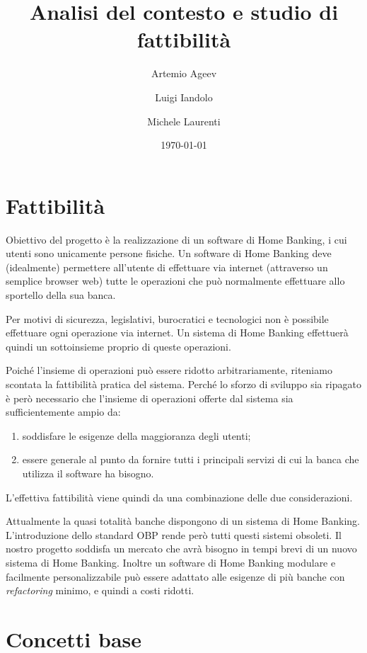 \documentclass[]{softeng}
\title{Analisi del contesto e studio di fattibilit\`a}
\author{Artemio Ageev \and Luigi Iandolo \and Michele Laurenti}
\date{\today}
\begin{document}
\maketitle


\section{Fattibilit\`a}

Obiettivo del progetto \`e la realizzazione di un software di Home Banking, i cui utenti sono unicamente persone fisiche.
Un software di Home Banking deve (idealmente) permettere all'utente di effettuare via internet (attraverso un semplice browser web) tutte le operazioni che pu\`o normalmente effettuare allo sportello della sua banca.

Per motivi di sicurezza, legislativi, burocratici e tecnologici non \`e possibile effettuare ogni operazione via internet.
Un sistema di Home Banking effettuer\`a quindi un sottoinsieme proprio di queste operazioni.

Poich\'e l'insieme di operazioni pu\`o essere ridotto arbitrariamente, riteniamo scontata la fattibilit\`a pratica del sistema.
Perch\'e lo sforzo di sviluppo sia ripagato \`e per\`o necessario che l'insieme di operazioni offerte dal sistema sia sufficientemente ampio da:
\begin{enumerate}
	\item soddisfare le esigenze della maggioranza degli utenti;
	\item essere generale al punto da fornire tutti i principali servizi di cui la banca che utilizza il software ha bisogno.
\end{enumerate}
L'effettiva fattibilit\`a viene quindi da una combinazione delle due considerazioni.

Attualmente la quasi totalit\`a banche dispongono di un sistema di Home Banking.
L'introduzione dello standard OBP rende per\`o tutti questi sistemi obsoleti.
Il nostro progetto soddisfa un mercato che avr\`a bisogno in tempi brevi di un nuovo sistema di Home Banking.
Inoltre un software di Home Banking modulare e facilmente personalizzabile pu\`o essere adattato alle esigenze di pi\`u banche con \emph{refactoring} minimo, e quindi a costi ridotti.

\section{Concetti base}
\end{document}
